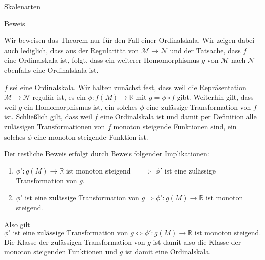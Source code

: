 \documentclass[
  8pt,
  ignorenonframetext,
]{beamer}
\providecommand{\tightlist}{%
  \setlength{\itemsep}{0pt}\setlength{\parskip}{0pt}}
\begin{document}
\begin{frame}{Skalenarten}
\protect\hypertarget{skalenarten-6}{}
\footnotesize

\underline{Beweis}

Wir beweisen das Theorem nur für den Fall einer Ordinalskala. Wir zeigen
dabei auch lediglich, dass aus der Regularität von
\(\mathcal{M} \to \mathcal{N}\) und der Tatsache, dass \(f\) eine
Ordinalskala ist, folgt, dass ein weiterer Homomorphismus \(g\) von
\(\mathcal{M}\) nach \(\mathcal{N}\) ebenfalls eine Ordinalskala ist.

\(f\) sei eine Ordinalskala. Wir halten zunächst fest, dass weil die
Repräsentation \(\mathcal{M} \to \mathcal{N}\) regulär ist, es ein
\(\phi : f(M) \to \mathbb{R}\) mit \(g = \phi \circ f\) gibt. Weiterhin
gilt, dass weil \(g\) ein Homomorphismus ist, ein solches \(\phi\) eine
zulässige Transformation von \(f\) ist. Schließlich gilt, dass weil
\(f\) eine Ordinalskala ist und damit per Definition alle zulässigen
Transformationen von \(f\) monoton steigende Funktionen sind, ein
solches \(\phi\) eine monoton steigende Funktion ist.

Der restliche Beweis erfolgt durch Beweis folgender Implikationen:

\begin{enumerate}
[(1)]
\tightlist
\item
  \(\phi' : g(M) \to \mathbb{R}\) ist monoton steigend
  \(\quad\,\,\Rightarrow\) \(\phi'\) ist eine zulässige Transformation
  von \(g\).
\item
  \(\phi'\) ist eine zulässige Transformation von
  \(g \Rightarrow \phi' : g(M) \to \mathbb{R}\) ist monoton steigend.
\end{enumerate}

Also gilt \begin{equation}
\phi' \mbox{ ist eine zulässige Transformation von } g \Leftrightarrow \phi' : g(M) \to \mathbb{R} \mbox{ ist monoton steigend}.
\end{equation} Die Klasse der zulässigen Transformation von \(g\) ist
damit also die Klasse der monoton steigenden Funktionen und \(g\) ist
damit eine Ordinalskala.
\end{frame}
\end{document}
